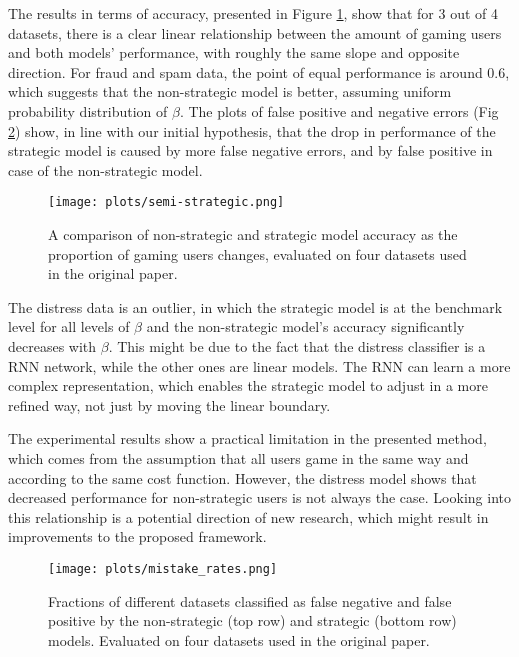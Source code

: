The results in terms of accuracy, presented in Figure \ref{fig:semi-strat}, show that for 3 out of 4 datasets, there is a clear linear relationship between the amount of gaming users and both models' performance, with roughly the same slope and opposite direction. For fraud and spam data, the point of equal performance is around 0.6, which suggests that the non-strategic model is better, assuming uniform probability distribution of $\beta$. The plots of false positive and negative errors (Fig \ref{fig:confusion}) show, in line with our initial hypothesis, that the drop in performance of the strategic model is caused by more false negative errors, and by false positive in case of the non-strategic model.

\begin{figure}[H]
    \centering
    \texttt{[image: plots/semi-strategic.png]}
    \caption{A comparison of non-strategic and strategic model accuracy as the proportion of gaming  users changes, evaluated on four datasets used in the original paper. }
    \label{fig:semi-strat}
\end{figure}

The distress data is an outlier, in which the strategic model is at the benchmark level for all levels of $\beta$ and the non-strategic model's accuracy significantly decreases with $\beta$. This might be due to the fact that the distress classifier is a RNN network, while the other ones are linear models. The RNN can learn a more complex representation, which enables the strategic model to adjust in a more refined way, not just by moving the linear boundary. 

The experimental results show a practical limitation in the presented method, which comes from the assumption that all users game in the same way and according to the same cost function. However, the distress model shows that decreased performance for non-strategic users is not always the case. Looking into this relationship is a potential direction of new research, which might result in improvements to the proposed framework.

\begin{figure}[H]
    \centering
    \texttt{[image: plots/mistake\_rates.png]}
    \caption{Fractions of different datasets classified as false negative and false positive by the non-strategic (top row) and strategic (bottom row) models. Evaluated on four datasets used in the original paper. }
    \label{fig:confusion}
\end{figure}

